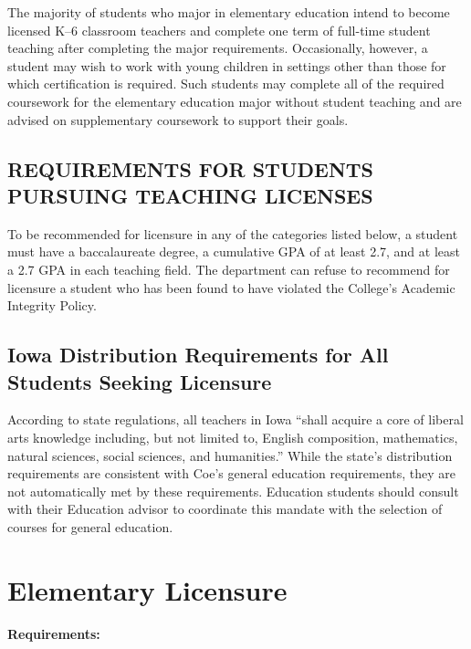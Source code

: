 \documentclass[
  letterpaper,
]{scrbook}
\begin{document}
The majority of students who major in elementary education intend to
become licensed K--6 classroom teachers and complete one term of
full-time student teaching after completing the major requirements.
Occasionally, however, a student may wish to work with young children in
settings other than those for which certification is required. Such
students may complete all of the required coursework for the elementary
education major without student teaching and are advised on
supplementary coursework to support their goals.

\subsection{REQUIREMENTS FOR STUDENTS PURSUING TEACHING
LICENSES}\label{requirements-for-students-pursuing-teaching-licenses}

To be recommended for licensure in any of the categories listed below, a
student must have a baccalaureate degree, a cumulative GPA of at least
2.7, and at least a 2.7 GPA in each teaching field. The department can
refuse to recommend for licensure a student who has been found to have
violated the College's Academic Integrity Policy.

\subsection{Iowa Distribution Requirements for All Students Seeking
Licensure}\label{iowa-distribution-requirements-for-all-students-seeking-licensure}

According to state regulations, all teachers in Iowa ``shall acquire a
core of liberal arts knowledge including, but not limited to, English
composition, mathematics, natural sciences, social sciences, and
humanities.'' While the state's distribution requirements are consistent
with Coe's general education requirements, they are not automatically
met by these requirements. Education students should consult with their
Education advisor to coordinate this mandate with the selection of
courses for general education.

\section{Elementary Licensure}\label{elementary-licensure}

\textbf{Requirements:}
\end{document}
